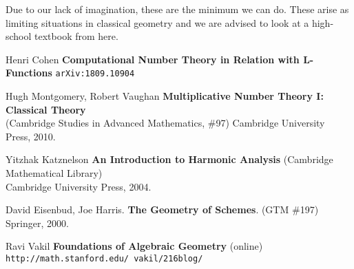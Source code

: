 \documentclass[12pt]{article}
\begin{document}
Due to our lack of imagination, these are the minimum we can do.  These arise as limiting situations in classical geometry and we are advised to look at a high-school textbook from here. 
\vfill
\begin{thebibliography}{} 

\item Henri Cohen \textbf{Computational Number Theory in Relation with L-Functions} \texttt{arXiv:1809.10904}

\item Hugh Montgomery, Robert Vaughan \textbf{Multiplicative Number Theory I: Classical Theory} \\ (Cambridge Studies in Advanced Mathematics, \#97) Cambridge University Press, 2010.

\item Yitzhak Katznelson \textbf{An Introduction to Harmonic Analysis} (Cambridge Mathematical Library) \\ Cambridge University Press, 2004.

\end{thebibliography}

\begin{thebibliography}{} 

\item David Eisenbud, Joe Harris.  \textbf{The Geometry of Schemes}. (GTM \#197) Springer, 2000.
\item Ravi Vakil \textbf{Foundations of Algebraic Geometry} (online) \texttt{http://math.stanford.edu/~vakil/216blog/}

\end{thebibliography}

\newpage
\end{document}
